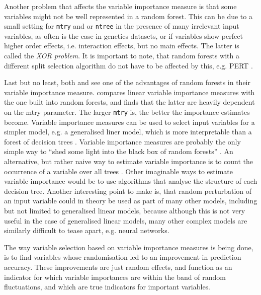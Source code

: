 \documentclass[a4paper,man,12pt,apacite,floatsintext,draftfirst]{apa6} %
\begin{document}
Another problem that affects the variable importance measure
is that some variables might not be well represented in a random forest.
This can be due to a small setting for \texttt{mtry} and or \texttt{ntree}
in the presence of many irrelevant input variables, as often is the case
in genetics datasets, or if variables show perfect higher order effects,
i.e. interaction effects, but no main effects.
The latter is called the \emph{XOR problem}.
It is important to note, that random forests with a different split selection
algorithm do not have to be affected by this, e.g. PERT \cite{cutler2001pert}.

Last but no least, both  and
 see one of the advantages of random forests in
their variable importance measure.
\cite{gromping2009variable} compares linear variable importance measures
with the one built into random forests, and finds that the latter are
heavily dependent on the mtry parameter.
The larger \texttt{mtry} is, the better the importance estimates become.
Variable importance measures can be used to select input variables for a simpler
model, e.g. a generalised liner model, which is more interpretable than a
forest of decision trees \cite{strobl2009introduction}.
Variable importance measures are probably the only simple way to
“shed some light into the black box of random forests”
\cite{gromping2009variable}.
An alternative, but rather naive way to estimate variable importance is to count
the occurrence of a variable over all trees \cite{strobl2009introduction}.
Other imaginable ways to estimate variable importance would be to use
algorithms that analyse the structure of each decision tree.
Another interesting point to make is, that random perturbation of an input
variable could in theory be used as part of many other models, including but
not limited to generalised linear models, because although
this is not very useful in the case of generalised linear models,
many other complex models are similarly difficult to tease apart, e.g.
neural networks.

The way variable selection based on variable importance measures is
being done, is to find variables whose randomisation led to an improvement
in prediction accuracy.
These improvements are just random effects, and function as an indicator
for which variable importances are within the band of random fluctuations,
and which are true indicators for important variables.
\end{document}
